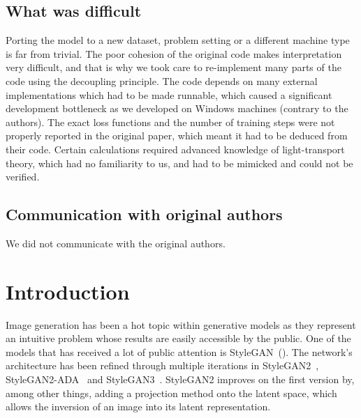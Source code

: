\subsection*{What was difficult}
Porting the model to a new dataset, problem setting or a different machine type is far from trivial. The poor cohesion of the original code makes interpretation very difficult, and that is why we took care to re-implement many parts of the code using the decoupling principle. The code depends on many external implementations which had to be made runnable, which caused a significant development bottleneck as we developed on Windows machines (contrary to the authors). The exact loss functions and the number of training steps were not properly reported in the original paper, which meant it had to be deduced from their code. Certain calculations required advanced knowledge of light-transport theory, which had no familiarity to us, and had to be mimicked and could not be verified.

\subsection*{Communication with original authors}
We did not communicate with the original authors.
\newpage

\section{Introduction}
Image generation has been a hot topic within generative models as they represent an intuitive problem whose results are easily accessible by the public. One of the models that has received a lot of public attention is StyleGAN~(\textcite{stylegan}). 
The network's architecture has been refined through multiple iterations in StyleGAN2~\cite{stylegan2}, StyleGAN2-ADA~\cite{stylegan2-ada} and StyleGAN3~\cite{stylegan3}. StyleGAN2 improves on the first version by, among other things, adding a projection method onto the latent space, which allows the inversion of an image into its latent representation. 

